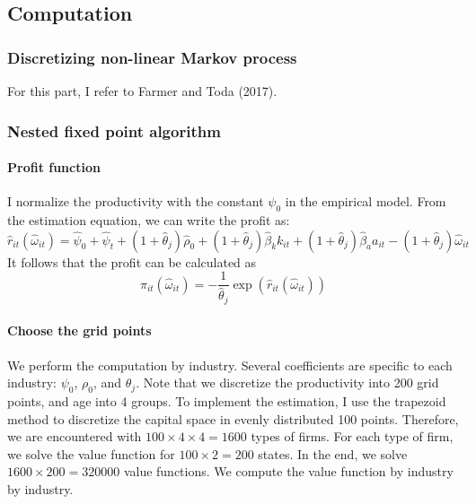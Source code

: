 \documentclass[11pt]{article}
\begin{document}
\subsection{Computation} \label{app_comp}
\subsubsection{Discretizing non-linear Markov process}

For this part, I refer to Farmer and Toda (2017). 

\subsubsection{Nested fixed point algorithm}

\paragraph{Profit function}

I normalize the productivity with the constant $\psi_{0}$ in the
empirical model. From the estimation equation, we can write the profit
as:
\begin{equation}
\hat{r}_{it}\left(\hat{\omega}_{it}\right)=\hat{\psi}_{0}+\hat{\psi}_{t}+\left(1+\hat{\theta}_{j}\right)\hat{\rho}_{0}+\left(1+\hat{\theta}_{j}\right)\hat{\beta}_{k}k_{it}+\left(1+\hat{\theta}_{j}\right)\hat{\beta}_{a}a_{it}-\left(1+\hat{\theta}_{j}\right)\hat{\omega}_{it}
\end{equation}
It follows that the profit can be calculated as 
\begin{equation}
\pi_{it}\left(\hat{\omega}_{it}\right)=-\frac{1}{\hat{\theta}_{j}}\exp\left(\hat{r}_{it}\left(\hat{\omega}_{it}\right)\right)
\end{equation}

\paragraph{Choose the grid points}

We perform the computation by industry. Several coefficients are specific
to each industry: $\psi_{0}$, $\rho_{0}$, and $\theta_{j}$. Note
that we discretize the productivity into 200 grid points, and age
into 4 groups. To implement the estimation, I use the trapezoid method
to discretize the capital space in evenly distributed 100 points.
Therefore, we are encountered with $100\times4\times4=1600$ types
of firms. For each type of firm, we solve the value function for $100\times2=200$
states. In the end, we solve $1600\times200=320000$ value functions.
We compute the value function by industry by industry. 
\end{document}
